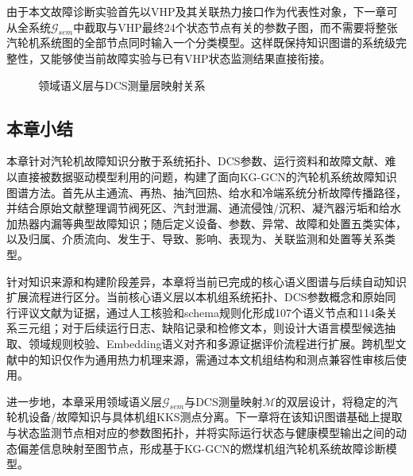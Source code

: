 由于本文故障诊断实验首先以VHP及其关联热力接口作为代表性对象，下一章可从全系统$\mathcal G_{sem}$中截取与VHP最终24个状态节点有关的参数子图，而不需要将整张汽轮机系统图的全部节点同时输入一个分类模型。这样既保持知识图谱的系统级完整性，又能够使当前故障实验与已有VHP状态监测结果直接衔接。

\begin{figure}[htbp]
\centering
{}
\caption{领域语义层与DCS测量层映射关系}
\label{fig:semantic_measurement_mapping}
\end{figure}

\subsection{本章小结}

本章针对汽轮机故障知识分散于系统拓扑、DCS参数、运行资料和故障文献、难以直接被数据驱动模型利用的问题，构建了面向KG-GCN的汽轮机系统故障知识图谱方法。首先从主通流、再热、抽汽回热、给水和冷端系统分析故障传播路径，并结合原始文献整理调节阀死区、汽封泄漏、通流侵蚀/沉积、凝汽器污垢和给水加热器内漏等典型故障知识；随后定义设备、参数、异常、故障和处置五类实体，以及归属、介质流向、发生于、导致、影响、表现为、关联监测和处置等关系类型。

针对知识来源和构建阶段差异，本章将当前已完成的核心语义图谱与后续自动知识扩展流程进行区分。当前核心语义层以本机组系统拓扑、DCS参数概念和原始同行评议文献为证据，通过人工核验和schema规则化形成107个语义节点和114条关系三元组；对于后续运行日志、缺陷记录和检修文本，则设计大语言模型候选抽取、领域规则校验、Embedding语义对齐和多源证据评价流程进行扩展。跨机型文献中的知识仅作为通用热力机理来源，需通过本文机组结构和测点兼容性审核后使用。

进一步地，本章采用领域语义层$\mathcal G_{sem}$与DCS测量映射$\mathcal M$的双层设计，将稳定的汽轮机设备/故障知识与具体机组KKS测点分离。下一章将在该知识图谱基础上提取与状态监测节点相对应的参数图拓扑，并将实际运行状态与健康模型输出之间的动态偏差信息映射至图节点，形成基于KG-GCN的燃煤机组汽轮机系统故障诊断模型。
